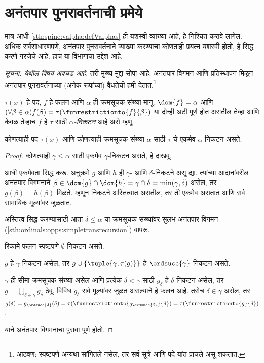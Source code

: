 \section{अनंतपार पुनरावर्तनाची प्रमेये}\label{sth:spine:recursion:sec}

मात्र आधी \ref{sth:spine:valpha:defValphas} ही यशस्वी व्याख्या आहे, हे निश्चित करावे लागेल. अधिक सर्वसाधारणपणे, अनंतपार पुनरावर्तनाने व्याख्या करण्याचा कोणताही प्रयत्न यशस्वी होतो, हे सिद्ध करणे गरजेचे आहे. हाच या विभागाचा उद्देश आहे.

\emph{सूचना: येथील विषय अवघड आहे}. तरी मुख्य मुद्दा सोपा आहे: अनंतपार विगमन आणि प्रतिस्थापन मिळून अनंतपार पुनरावर्तनाच्या (अनेक रूपांच्या) वैधतेची हमी देतात.\footnote{आठवण: स्पष्टपणे अन्यथा सांगितले नसेल, तर सर्व सूत्रे आणि पदे यांत प्राचले असू शकतात.}

\begin{defn}
	$\tau(x)$ हे पद, $f$ हे फलन आणि $\alpha$ ही क्रमसूचक संख्या मानू. $\dom{f} = \alpha$ आणि $(\forall \beta \in \alpha)f(\beta) = \tau(\funrestrictionto{f}{\beta})$ या दोन्ही अटी पूर्ण होत असतील तेव्हा आणि केवळ तेव्हाच $f$ हे $\tau$ साठी \emph{$\alpha$-निकटन} आहे असे म्हणू.
\end{defn}

\begin{lem}[परिबद्ध पुनरावर्तन]\label{sth:spine:recursion:transrecursionfun}
कोणत्याही पद $\tau(x)$ आणि कोणत्याही क्रमसूचक संख्या $\alpha$ साठी $\tau$ चे एकमेव $\alpha$-निकटन असते.
\end{lem}
\begin{proof}
कोणत्याही $\gamma \leq \alpha$ साठी एकमेव $\gamma$-निकटन असते, हे दाखवू.

आधी एकमेवता सिद्ध करू. अनुक्रमे $g$ आणि $h$ ही $\gamma$- आणि $\delta$-निकटने असू द्या. त्यांच्या आदानांवरील अनंतपार विगमनाने $\beta \in \dom{g} \cap \dom{h} =
\gamma \cap \delta = \min(\gamma, \delta)$ असेल, तर $g(\beta) = h(\beta)$ मिळते. म्हणून निकटने अस्तित्वात असतील, तर ती एकमेव असतात आणि सर्व सामायिक मूल्यांवर जुळतात.

अस्तित्व सिद्ध करण्यासाठी आता $\delta \leq \alpha$ या क्रमसूचक संख्यांवर सुलभ अनंतपार विगमन (\ref{sth:ordinals:opps:simpletransrecursion}) वापरू.

रिकामे फलन स्पष्टपणे $\emptyset$-निकटन असते.

$g$ हे $\gamma$-निकटन असेल, तर $g \cup
\{\tuple{\gamma, \tau(g)}\}$ हे $\ordsucc{\gamma}$-निकटन असते.

$\gamma$ ही सीमा क्रमसूचक संख्या असेल आणि प्रत्येक $\delta < \gamma$ साठी $g_\delta$ हे $\delta$-निकटन असेल, तर $g = \bigcup_{\delta \in \gamma} g_\delta$ ठेवू. विविध $g_\delta$ सर्व मूल्यांवर जुळत असल्याने हे फलन आहे. तसेच $\delta \in \gamma$ असेल, तर $g(\delta) = g_{\ordsucc{\delta}}(\delta) =
\tau(\funrestrictionto{g_{\ordsucc{\delta}}}{\delta}) =
\tau(\funrestrictionto{g}{\delta})$.

याने अनंतपार विगमनाचा पुरावा पूर्ण होतो.
\end{proof}

